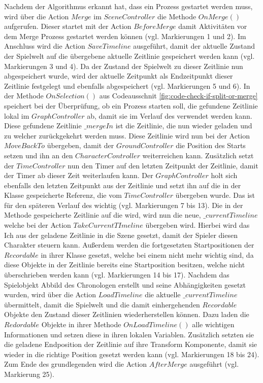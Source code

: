 Nachdem der Algorithmus erkannt hat, dass ein  Prozess gestartet werden muss, wird über die Action $Merge$ im $SceneController$ die Methode $OnMerge()$ aufgerufen. Dieser startet mit der Action $BeforeMerge$ damit Aktivitäten vor dem Merge Prozess gestartet werden können (vgl. Markierungen 1 und 2). Im Anschluss wird die Action $SaveTimeline$ ausgeführt, damit der aktuelle Zustand der Spielwelt auf die übergebene aktuelle Zeitlinie gespeichert werden kann (vgl. Markierungen 3 und 4). Da der Zustand der Spielwelt zu dieser Zeitlinie nun abgespeichert wurde, wird der aktuelle Zeitpunkt als Endzeitpunkt dieser Zeitlinie festgelegt und ebenfalls abgespeichert (vgl. Markierungen 5 und 6). In der Methode $OnSelection()$ aus Codeausschnit \ref{fig:code-check-if-split-or-merge} speichert bei der Überprüfung, ob ein  Prozess starten soll, die gefundene Zeitlinie lokal im $GraphController$ ab, damit sie im Verlauf des  verwendet werden kann. Diese gefundene Zeitlinie $\_mergeIn$ ist die Zeitlinie, die nun wieder geladen und zu welcher zurückgekehrt werden muss. Diese Zeitlinie wird nun bei der Action $MoveBackTo$ übergeben, damit der $GroundController$ die Position des Starts setzen und ihn an den $CharacterController$ weiterreichen kann. Zusätzlich setzt der $TimeController$ nun den Timer auf den letzten Zeitpunkt der Zeitlinie, damit der Timer ab dieser Zeit weiterlaufen kann. Der $GraphController$ holt sich ebenfalls den letzten Zeitpunkt aus der Zeitlinie und setzt ihn auf die in der Klasse gespeicherte Referenz, die vom $TimeController$ übergeben wurde. Das ist für den späteren Verlauf des  wichtig (vgl. Markierungen 7 bis 13). Die in der Methode gespeicherte Zeitlinie auf die  wird, wird nun die neue, $\_currentTimeline$ welche bei der Action $TakeCurrentTImeline$ übergeben wird. Hierbei wird das Ich aus der geladene Zeitlinie in die Szene gesetzt, damit der Spieler diesen Charakter steuern kann. Außerdem werden die fortgesetzten Startpositionen der $Recordable$ in ihrer Klasse gesetzt, welche bei einem  nicht mehr wichtig sind, da diese Objekte in der Zeitlinie bereits eine Startposition besitzen, welche nicht überschrieben werden kann (vgl. Markierungen 14 bis 17). Nachdem das Spielobjekt Abbild des Chronologen erstellt und seine Abhängigkeiten gesetzt wurden, wird über die Action $LoadTimeline$ die aktuelle $\_currentTimeline$ übermittelt, damit die Spielwelt und die damit einhergehenden $Recordable$ Objekte den Zustand dieser Zeitlinien wiederherstellen können. Dazu laden die $Redordable$ Objekte in ihrer Methode $OnLoadTimeline()$ alle wichtigen Informationen und setzen diese in ihren lokalen Variablen. Zusätzlich setzten sie die geladene Endposition der Zeitlinie auf ihre Transform Komponente, damit sie wieder in die richtige Position gesetzt werden kann (vgl. Markierungen 18 bis 24). Zum Ende des grundlegenden  wird die Action $AfterMerge$ ausgeführt (vgl. Markierung 25).

